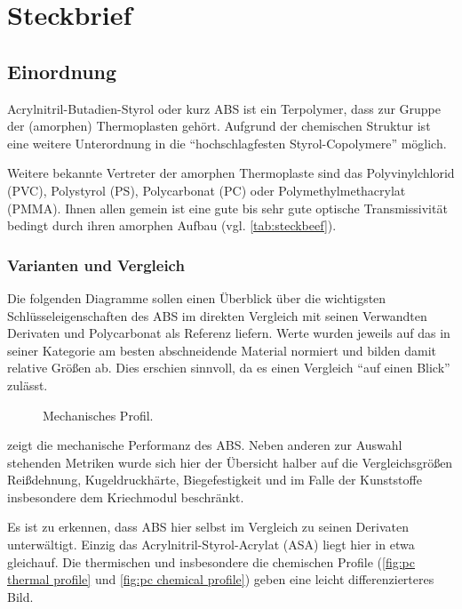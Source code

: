 \chapter{Steckbrief}
    \section{Einordnung}
        Acrylnitril-Butadien-Styrol oder kurz ABS ist ein Terpolymer, dass zur Gruppe der (amorphen) Thermoplasten gehört. Aufgrund
        der chemischen Struktur ist eine weitere Unterordnung in die \enquote{hochschlagfesten Styrol-Copolymere}\cite{Eyerer.2020.Polymer.Engineering.1}
        möglich.

        Weitere bekannte Vertreter der amorphen Thermoplaste sind das Polyvinylchlorid (PVC), Polystyrol (PS), Polycarbonat (PC)
        oder Polymethylmethacrylat (PMMA). Ihnen allen gemein ist eine gute bis sehr gute optische Transmissivität bedingt durch ihren amorphen Aufbau (vgl. \cref{tab:steckbeef}).
        \subsection{Varianten und Vergleich}
            Die folgenden Diagramme sollen einen Überblick über die wichtigsten Schlüsseleigenschaften des ABS im direkten Vergleich
            mit seinen Verwandten Derivaten und Polycarbonat als Referenz liefern. Werte wurden jeweils auf das in seiner
            Kategorie am besten abschneidende Material normiert und bilden damit relative Größen ab. Dies erschien sinnvoll,
            da es einen Vergleich \enquote{auf einen Blick} zulässt.

            \begin{figure}[h]
                \centering
                
                \caption{Mechanisches Profil.}
                \label{fig:pc mechanical profile}
            \end{figure}\par
             zeigt die mechanische Performanz des ABS\@. Neben anderen zur Auswahl stehenden
            Metriken wurde sich hier der Übersicht halber auf die Vergleichsgrößen Reißdehnung, Kugeldruckhärte, Biegefestigkeit
            und im Falle der Kunststoffe insbesondere dem Kriechmodul beschränkt.

            Es ist zu erkennen, dass ABS hier selbst im Vergleich zu seinen Derivaten unterwältigt. Einzig das
            Acrylnitril-Styrol-Acrylat (ASA) liegt hier in etwa gleichauf. Die thermischen und insbesondere die chemischen Profile
            (\cref{fig:pc thermal profile} und \cref{fig:pc chemical profile}) geben eine leicht differenzierteres Bild.

